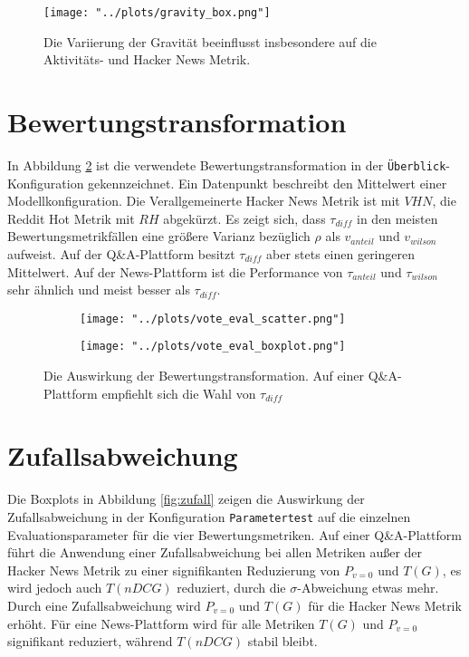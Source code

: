 \begin{figure}[!h]
	\texttt{[image: "../plots/gravity\_box.png"]}
	\caption{Die Variierung der Gravität beeinflusst insbesondere auf die Aktivitäts- und Hacker News Metrik.}
	\label{fig:grav}
\end{figure}

\section{Bewertungstransformation}

In Abbildung \ref{fig:trans} ist die verwendete Bewertungstransformation in der \texttt{Überblick}-Konfiguration gekennzeichnet. Ein Datenpunkt beschreibt den Mittelwert einer Modellkonfiguration. Die Verallgemeinerte Hacker News Metrik ist mit $VHN$, die Reddit Hot Metrik mit $RH$ abgekürzt. Es zeigt sich, dass $\tau_{diff}$ in den meisten Bewertungsmetrikfällen eine größere Varianz bezüglich $\rho$ als $v_{anteil}$ und $v_{wilson}$ aufweist. Auf der Q\&A-Plattform besitzt $\tau_{diff}$ aber stets einen geringeren Mittelwert. Auf der News-Plattform ist die Performance von $\tau_{anteil}$ und $\tau_{wilson}$ sehr ähnlich und meist besser als $\tau_{diff}$. 

\begin{figure}[!h]
	\begin{subfigure}{0.5\textwidth}
		\texttt{[image: "../plots/vote\_eval\_scatter.png"]}
	\end{subfigure}
	\begin{subfigure}{0.5\textwidth}
		\texttt{[image: "../plots/vote\_eval\_boxplot.png"]}
	\end{subfigure}
	\caption{Die Auswirkung der Bewertungstransformation. Auf einer Q\&A-Plattform empfiehlt sich die Wahl von $\tau_{diff}$}
	\label{fig:trans}
\end{figure}


\section{Zufallsabweichung}


Die Boxplots in Abbildung \ref{fig:zufall} zeigen die Auswirkung der Zufallsabweichung in der Konfiguration \texttt{Parametertest} auf die einzelnen Evaluationsparameter für die vier Bewertungsmetriken. Auf einer Q\&A-Plattform führt die Anwendung einer Zufallsabweichung bei allen Metriken außer der Hacker News Metrik zu einer signifikanten Reduzierung von $P_{v=0}$ und $T(G)$, es wird jedoch auch $T(nDCG)$ reduziert, durch die $\sigma$-Abweichung etwas mehr. Durch eine Zufallsabweichung wird $P_{v=0}$ und $T(G)$ für die Hacker News Metrik erhöht. Für eine News-Plattform wird für alle Metriken $T(G)$ und $P_{v=0}$ signifikant reduziert, während $T(nDCG)$ stabil bleibt.

